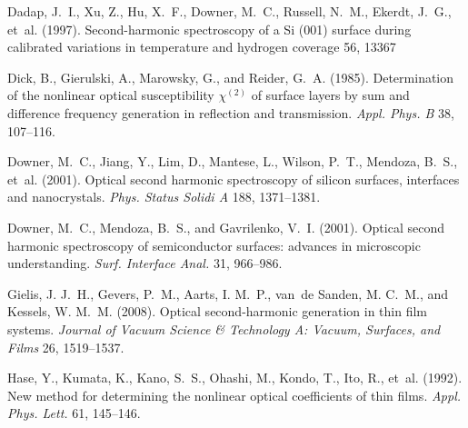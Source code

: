 \documentclass[utf8]{frontiersSCNS}
\begin{document}
\begin{thebibliography}{40}
Dadap, J.~I., Xu, Z., Hu, X.~F., Downer, M.~C., Russell, N.~M., Ekerdt, J.~G.,
  et~al. (1997).
\newblock Second-harmonic spectroscopy of a {Si} (001) surface during
  calibrated variations in temperature and hydrogen coverage 56, 13367

Dick, B., Gierulski, A., Marowsky, G., and Reider, G.~A. (1985).
\newblock Determination of the nonlinear optical susceptibility $\chi^{(2)}$ of
  surface layers by sum and difference frequency generation in reflection and
  transmission.
\newblock \emph{Appl. Phys. B} 38, 107--116.
\newblock {}

Downer, M.~C., Jiang, Y., Lim, D., Mantese, L., Wilson, P.~T., Mendoza, B.~S.,
  et~al. (2001{}).
\newblock Optical second harmonic spectroscopy of silicon surfaces, interfaces
  and nanocrystals.
\newblock \emph{Phys. Status Solidi A} 188, 1371--1381.
\newblock {}

Downer, M.~C., Mendoza, B.~S., and Gavrilenko, V.~I. (2001{}).
\newblock Optical second harmonic spectroscopy of semiconductor surfaces:
  advances in microscopic understanding.
\newblock \emph{Surf. Interface Anal.} 31, 966--986.
\newblock {}

Gielis, J. J.~H., Gevers, P.~M., Aarts, I. M.~P., van~de Sanden, M. C.~M., and
  Kessels, W. M.~M. (2008).
\newblock Optical second-harmonic generation in thin film systems.
\newblock \emph{Journal of Vacuum Science \& Technology A: Vacuum, Surfaces,
  and Films} 26, 1519--1537.
\newblock {}

Hase, Y., Kumata, K., Kano, S.~S., Ohashi, M., Kondo, T., Ito, R., et~al.
  (1992).
\newblock New method for determining the nonlinear optical coefficients of thin
  films.
\newblock \emph{Appl. Phys. Lett.} 61, 145--146.
\newblock {}


\end{thebibliography}
\end{document}
